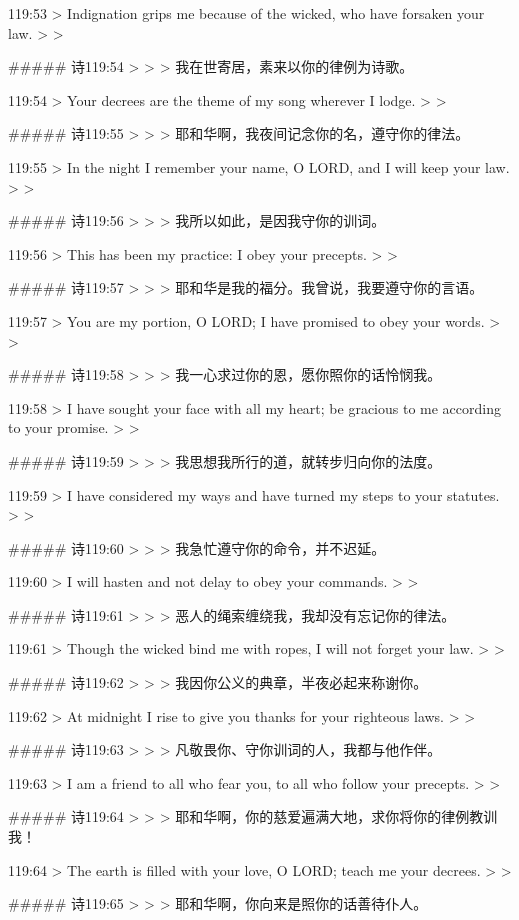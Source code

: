 119:53
> Indignation grips me because of the wicked, who have forsaken your law.
>
> 


##### 诗119:54
> 
>
> 我在世寄居，素来以你的律例为诗歌。


119:54
> Your decrees are the theme of my song wherever I lodge.
>
> 


##### 诗119:55
> 
>
> 耶和华啊，我夜间记念你的名，遵守你的律法。


119:55
> In the night I remember your name, O LORD, and I will keep your law.
>
> 


##### 诗119:56
> 
>
> 我所以如此，是因我守你的训词。


119:56
> This has been my practice: I obey your precepts.
>
> 


##### 诗119:57
> 
>
> 耶和华是我的福分。我曾说，我要遵守你的言语。


119:57
> You are my portion, O LORD; I have promised to obey your words.
>
> 


##### 诗119:58
> 
>
> 我一心求过你的恩，愿你照你的话怜悯我。


119:58
> I have sought your face with all my heart; be gracious to me according to your promise.
>
> 


##### 诗119:59
> 
>
> 我思想我所行的道，就转步归向你的法度。


119:59
> I have considered my ways and have turned my steps to your statutes.
>
> 


##### 诗119:60
> 
>
> 我急忙遵守你的命令，并不迟延。


119:60
> I will hasten and not delay to obey your commands.
>
> 


##### 诗119:61
> 
>
> 恶人的绳索缠绕我，我却没有忘记你的律法。


119:61
> Though the wicked bind me with ropes, I will not forget your law.
>
> 


##### 诗119:62
> 
>
> 我因你公义的典章，半夜必起来称谢你。


119:62
> At midnight I rise to give you thanks for your righteous laws.
>
> 


##### 诗119:63
> 
>
> 凡敬畏你、守你训词的人，我都与他作伴。


119:63
> I am a friend to all who fear you, to all who follow your precepts.
>
> 


##### 诗119:64
> 
>
> 耶和华啊，你的慈爱遍满大地，求你将你的律例教训我！


119:64
> The earth is filled with your love, O LORD; teach me your decrees.
>
> 


##### 诗119:65
> 
>
> 耶和华啊，你向来是照你的话善待仆人。


